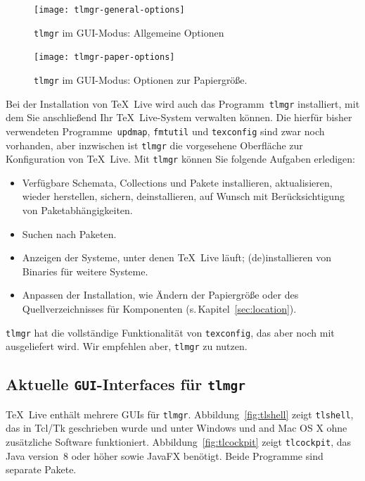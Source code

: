 \documentclass[12pt,ngerman,a4paper,fullparskip]{scrreprt}
\newcommand{\TL}{\TeX\ Live\xspace}
\newcommand{\cmdname}[1]{\texttt{#1}}
\newcommand{\prog}[1]{\texttt{#1}}
\begin{document}
\begin{figure}[h]
	\centering
    \texttt{[image: tlmgr-general-options]}
    \caption{\texttt{tlmgr} im GUI-Modus: Allgemeine Optionen}
    \label{fig:tlmgr-general-options}
\end{figure}

\begin{figure}[h]
\centering
\texttt{[image: tlmgr-paper-options]}
    \caption{\texttt{tlmgr} im GUI-Modus: Optionen zur Papiergröße.}
    \label{fig:tlmgr-paper-options}
\end{figure}

Bei der Installation von \TL wird auch das Programm~\prog{tlmgr} installiert, mit dem Sie anschließend Ihr \TL-System verwalten können. Die hierfür bisher verwendeten Programme~\prog{updmap}, \prog{fmtutil} und \prog{texconfig} sind zwar noch vorhanden, aber inzwischen ist \prog{tlmgr} die vorgesehene Oberfläche zur Konfiguration von \TL. Mit \prog{tlmgr} können Sie folgende Aufgaben erledigen:

\begin{itemize} %
\item Verfügbare Schemata, Collections und Pakete installieren, aktualisieren, wieder
     herstellen, sichern, deinstallieren, auf Wunsch mit Berücksichtigung von Paketabhängigkeiten.
\item Suchen nach Paketen.
\item Anzeigen der Systeme, unter denen \TL läuft; (de)installieren von Binaries für weitere Systeme.
\item Anpassen der Installation, wie Ändern der Papiergröße oder des Quellverzeichnisses für Komponenten
 (s.\,Kapitel~\ref{sec:location}).
\end{itemize}

\prog{tlmgr} hat die vollständige Funktionalität von \prog{texconfig}, das aber noch mit ausgeliefert wird. Wir empfehlen aber, \prog{tlmgr} zu nutzen.

\subsection{Aktuelle \texttt{GUI}-Interfaces für \cmdname{tlmgr}}

\TL{} enthält mehrere GUIs für \prog{tlmgr}. Abbildung~\ref{fig:tlshell} zeigt \cmdname{tlshell},
das in Tcl/Tk geschrieben wurde und unter Windows und 
and Mac OS X ohne zusätzliche Software funktioniert. Abbildung~\ref{fig:tlcockpit} zeigt \prog{tlcockpit}, das Java version~8 oder höher sowie JavaFX benötigt. Beide Programme sind separate Pakete.
\end{document}
